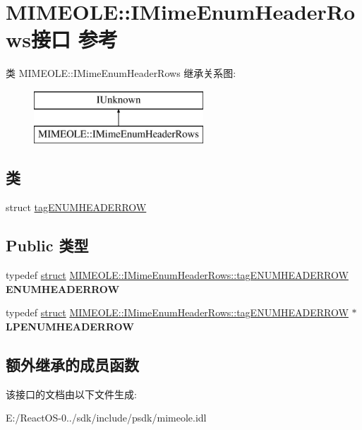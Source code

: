 \hypertarget{interface_m_i_m_e_o_l_e_1_1_i_mime_enum_header_rows}{}\section{M\+I\+M\+E\+O\+LE\+:\+:I\+Mime\+Enum\+Header\+Rows接口 参考}
\label{interface_m_i_m_e_o_l_e_1_1_i_mime_enum_header_rows}
类 M\+I\+M\+E\+O\+LE\+:\+:I\+Mime\+Enum\+Header\+Rows 继承关系图\+:\begin{figure}[H]
\begin{center}
\leavevmode
\includegraphics[height=2.000000cm]{interface_m_i_m_e_o_l_e_1_1_i_mime_enum_header_rows}
\end{center}
\end{figure}
\subsection*{类}
\begin{DoxyCompactItemize}
\item 
struct \hyperlink{struct_m_i_m_e_o_l_e_1_1_i_mime_enum_header_rows_1_1tag_e_n_u_m_h_e_a_d_e_r_r_o_w}{tag\+E\+N\+U\+M\+H\+E\+A\+D\+E\+R\+R\+OW}
\end{DoxyCompactItemize}
\subsection*{Public 类型}
\begin{DoxyCompactItemize}
\item 
\mbox{\label{interface_m_i_m_e_o_l_e_1_1_i_mime_enum_header_rows_a16676c01f456926400a12ba2306b7e05}} 
typedef \hyperlink{interfacestruct}{struct} \hyperlink{struct_m_i_m_e_o_l_e_1_1_i_mime_enum_header_rows_1_1tag_e_n_u_m_h_e_a_d_e_r_r_o_w}{M\+I\+M\+E\+O\+L\+E\+::\+I\+Mime\+Enum\+Header\+Rows\+::tag\+E\+N\+U\+M\+H\+E\+A\+D\+E\+R\+R\+OW} {\bfseries E\+N\+U\+M\+H\+E\+A\+D\+E\+R\+R\+OW}
\item 
\mbox{\label{interface_m_i_m_e_o_l_e_1_1_i_mime_enum_header_rows_a359a5cbb27d938259b0073e56d85454c}} 
typedef \hyperlink{interfacestruct}{struct} \hyperlink{struct_m_i_m_e_o_l_e_1_1_i_mime_enum_header_rows_1_1tag_e_n_u_m_h_e_a_d_e_r_r_o_w}{M\+I\+M\+E\+O\+L\+E\+::\+I\+Mime\+Enum\+Header\+Rows\+::tag\+E\+N\+U\+M\+H\+E\+A\+D\+E\+R\+R\+OW} $\ast$ {\bfseries L\+P\+E\+N\+U\+M\+H\+E\+A\+D\+E\+R\+R\+OW}
\end{DoxyCompactItemize}
\subsection*{额外继承的成员函数}


该接口的文档由以下文件生成\+:\begin{DoxyCompactItemize}
\item 
E\+:/\+React\+O\+S-\/0../sdk/include/psdk/mimeole.\+idl\end{DoxyCompactItemize}
